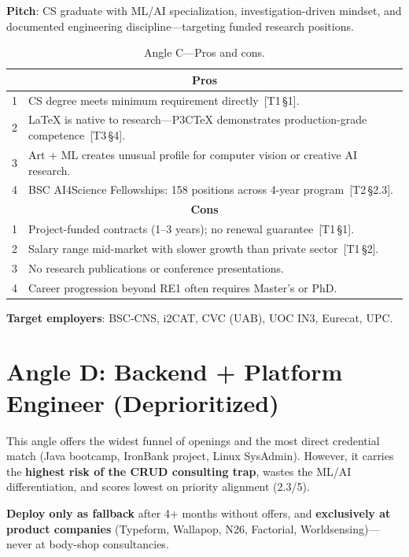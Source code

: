 \documentclass[a4paper,11pt,openany]{report}
\begin{document}
\textbf{Pitch}: CS graduate with ML/AI specialization, investigation-driven
mindset, and documented engineering discipline---targeting funded research
positions.

\begin{table}[htbp]
\centering
\caption{Angle C---Pros and cons.}
\label{tab:angle-c}
\small
\begin{tabularx}{\textwidth}{c X}
\toprule
\multicolumn{2}{c}{\textbf{Pros}} \\
\midrule
1 & CS degree meets minimum requirement directly~[T1\,§1]. \\
2 & LaTeX is native to research---P3CTeX demonstrates production-grade competence~[T3\,§4]. \\
3 & Art + ML creates unusual profile for computer vision or creative AI research. \\
4 & BSC AI4Science Fellowships: 158 positions across 4-year program~[T2\,§2.3]. \\
\midrule
\multicolumn{2}{c}{\textbf{Cons}} \\
\midrule
1 & Project-funded contracts (1--3 years); no renewal guarantee~[T1\,§1]. \\
2 & Salary range mid-market with slower growth than private sector~[T1\,§2]. \\
3 & No research publications or conference presentations. \\
4 & Career progression beyond RE1 often requires Master's or PhD. \\
\bottomrule
\end{tabularx}
\end{table}

\textbf{Target employers}: BSC-CNS, i2CAT, CVC (UAB), UOC IN3, Eurecat, UPC.

\section{Angle D: Backend + Platform Engineer (Deprioritized)}

This angle offers the widest funnel of openings and the most direct credential
match (Java bootcamp, IronBank project, Linux SysAdmin). However, it carries
the \textbf{highest risk of the CRUD consulting trap}, wastes the ML/AI
differentiation, and scores lowest on priority alignment (2.3/5).

\textbf{Deploy only as fallback} after 4+ months without offers, and
\textbf{exclusively at product companies} (Typeform, Wallapop, N26, Factorial,
Worldsensing)---never at body-shop consultancies.
\end{document}
